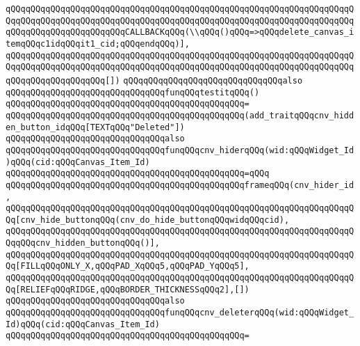 \verb|qQQqqQQqqQQqqQQqqQQqqQQqqQQqqQQqqQQqqQQqqQQqqQQqqQQqqQQqqQQqqQQqqQQqqQQqqQQqqQQqqQQqqQQqqQQqqQQqqQQqqQQqqQQqqQQqqQQqqQQqqQQqqQQqqQQqqQQqqQQqqQQqqQQqqQQqqQQqqQQqqQQqCALLBACKqQQq(\\qQQq()qQQq=>qQQqdelete_canvas_itemqQQqc1idqQQqit1_cid;qQQqendqQQq)],|\newline
\verb|qQQqqQQqqQQqqQQqqQQqqQQqqQQqqQQqqQQqqQQqqQQqqQQqqQQqqQQqqQQqqQQqqQQqqQQqqQQqqQQqqQQqqQQqqQQqqQQqqQQqqQQqqQQqqQQqqQQqqQQqqQQqqQQqqQQqqQQqqQQqqQQqqQQqqQQqqQQqqQQq[])|\newline
\newline
\verb|qQQqqQQqqQQqqQQqqQQqqQQqqQQqqQQqalso|\newline
\verb|qQQqqQQqqQQqqQQqqQQqqQQqqQQqqQQqfunqQQqtestitqQQq()|\newline
\verb|qQQqqQQqqQQqqQQqqQQqqQQqqQQqqQQqqQQqqQQqqQQqqQQq=|\newline
\verb|qQQqqQQqqQQqqQQqqQQqqQQqqQQqqQQqqQQqqQQqqQQqqQQq(add_traitqQQqcnv_hidden_button_idqQQq[TEXTqQQq"Deleted"])|\newline
\newline
\verb|qQQqqQQqqQQqqQQqqQQqqQQqqQQqqQQqalso|\newline
\verb|qQQqqQQqqQQqqQQqqQQqqQQqqQQqqQQqfunqQQqcnv_hiderqQQq(wid:qQQqWidget_Id)qQQq(cid:qQQqCanvas_Item_Id)|\newline
\verb|qQQqqQQqqQQqqQQqqQQqqQQqqQQqqQQqqQQqqQQqqQQqqQQq=qQQq|\newline
\verb|qQQqqQQqqQQqqQQqqQQqqQQqqQQqqQQqqQQqqQQqqQQqqQQqframeqQQq(cnv_hider_id,|\newline
\verb|qQQqqQQqqQQqqQQqqQQqqQQqqQQqqQQqqQQqqQQqqQQqqQQqqQQqqQQqqQQqqQQqqQQqqQQq[cnv_hide_buttonqQQq(cnv_do_hide_buttonqQQqwidqQQqcid),|\newline
\verb|qQQqqQQqqQQqqQQqqQQqqQQqqQQqqQQqqQQqqQQqqQQqqQQqqQQqqQQqqQQqqQQqqQQqqQQqqQQqcnv_hidden_buttonqQQq()],|\newline
\verb|qQQqqQQqqQQqqQQqqQQqqQQqqQQqqQQqqQQqqQQqqQQqqQQqqQQqqQQqqQQqqQQqqQQqqQQq[FILLqQQqONLY_X,qQQqPAD_XqQQq5,qQQqPAD_YqQQq5],|\newline
\verb|qQQqqQQqqQQqqQQqqQQqqQQqqQQqqQQqqQQqqQQqqQQqqQQqqQQqqQQqqQQqqQQqqQQqqQQq[RELIEFqQQqRIDGE,qQQqBORDER_THICKNESSqQQq2],[])|\newline
\newline
\verb|qQQqqQQqqQQqqQQqqQQqqQQqqQQqqQQqalso|\newline
\verb|qQQqqQQqqQQqqQQqqQQqqQQqqQQqqQQqfunqQQqcnv_deleterqQQq(wid:qQQqWidget_Id)qQQq(cid:qQQqCanvas_Item_Id)|\newline
\verb|qQQqqQQqqQQqqQQqqQQqqQQqqQQqqQQqqQQqqQQqqQQqqQQq=|\newline
